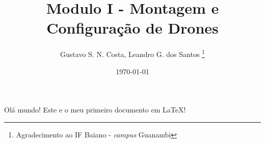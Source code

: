 \documentclass {article}
\title{Modulo I - \textbf{Montagem e Configuração de Drones}}
\author{Gustavo S. N. Costa, Leandro G. dos Santos \thanks{Agradecimento ao IF Baiano - \textit{campus} Guanambi}}
\date{\today}
\begin{document}
    \maketitle
    Olá mundo! Este e o meu primeiro documento em LaTeX!
\end{document}
